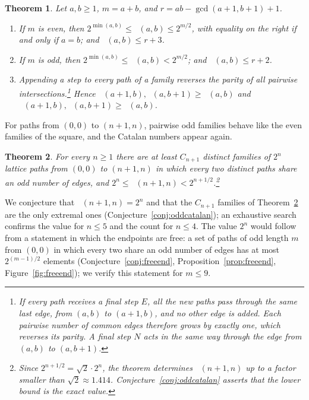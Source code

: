 \documentclass[11pt]{amsart}
\newtheorem{introthm}{Theorem}
\theoremstyle{definition}
\theoremstyle{remark}
\numberwithin{equation}{section}
\DeclareMathOperator{\Meven}{M_{ev}}
\DeclareMathOperator{\Modd}{M_{od}}
\begin{document}
\begin{introthm}\label{thm:D}
Let $a,b\ge1$, $m=a+b$, and $r=ab-\gcd(a+1,b+1)+1$.
\begin{enumerate}[label=\textup{(\roman*)}]
\item If $m$ is even, then $2^{\min(a,b)}\le\Meven(a,b)\le 2^{m/2}$, with equality on the right if and only if $a=b$; and $\Modd(a,b)\le r+3$.
\item If $m$ is odd, then $2^{\min(a,b)}\le\Modd(a,b)<2^{m/2}$; and $\Meven(a,b)\le r+2$.
\item Appending a step to every path of a family reverses the parity of all pairwise intersections.\footnote{If every path receives a final step $E$, all the new paths pass through the same last edge, from $(a,b)$ to $(a+1,b)$, and no other edge is added. Each pairwise number of common edges therefore grows by exactly one, which reverses its parity. A final step $N$ acts in the same way through the edge from $(a,b)$ to $(a,b+1)$.} Hence $\Modd(a+1,b),\Modd(a,b+1)\ge\Meven(a,b)$ and $\Meven(a+1,b),\Meven(a,b+1)\ge\Modd(a,b)$.
\end{enumerate}
\end{introthm}

For paths from $(0,0)$ to $(n+1,n)$, pairwise odd families behave like the even families of the square, and the Catalan numbers appear again.

\begin{introthm}\label{thm:E}
For every $n\ge1$ there are at least $C_{n+1}$ distinct families of $2^n$ lattice paths from $(0,0)$ to $(n+1,n)$ in which every two distinct paths share an odd number of edges, and $2^n\le\Modd(n+1,n)<2^{n+1/2}$.\footnote{Since $2^{n+1/2}=\sqrt2\cdot2^n$, the theorem determines $\Modd(n+1,n)$ up to a factor smaller than $\sqrt2\approx1.414$. Conjecture~\ref{conj:oddcatalan} asserts that the lower bound is the exact value.}
\end{introthm}

We conjecture that $\Modd(n+1,n)=2^n$ and that the $C_{n+1}$ families of Theorem~\ref{thm:E} are the only extremal ones (Conjecture~\ref{conj:oddcatalan}); an exhaustive search confirms the value for $n\le5$ and the count for $n\le4$. The value $2^n$ would follow from a statement in which the endpoints are free: a set of paths of odd length $m$ from $(0,0)$ in which every two share an odd number of edges has at most $2^{(m-1)/2}$ elements (Conjecture~\ref{conj:freeend}, Proposition~\ref{prop:freeend}, Figure~\ref{fig:freeend}); we verify this statement for $m\le9$.
\end{document}
